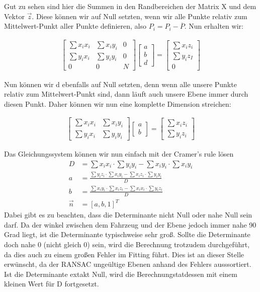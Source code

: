 \documentclass[11pt,oneside,openright]{mpreport}
\begin{document}
Gut zu sehen sind hier die Summen in den Randbereichen der Matrix X und dem Vektor $\vec{z}$. Diese können wir auf Null setzten, wenn wir alle Punkte relativ zum Mittelwert-Punkt
aller Punkte definieren, also $P_i = P_i - \overline{P}$. Nun erhalten wir:

\begin{align*}
\begin{bmatrix}
\sum x_i x_i & \sum x_i y_i & 0 \\
\sum y_i x_i & \sum y_i y_i & 0 \\
0 & 0 & N
\end{bmatrix} 
\begin{bmatrix}
a \\
b \\
d 
\end{bmatrix} 
 = 
\begin{bmatrix}
\sum x_i z_i \\
\sum y_i z_I \\
0 
\end{bmatrix} 
\end{align*}

Nun können wir d ebenfalls auf Null setzten, denn wenn alle unsere Punkte relativ zum Mittelwert-Punkt sind, dann läuft auch unsere Ebene immer durch diesen Punkt. Daher können wir 
nun eine komplette Dimension streichen:

\begin{align*}
\begin{bmatrix}
\sum x_i x_i & \sum x_i y_i \\
\sum y_i x_i & \sum y_i y_i
\end{bmatrix} 
\begin{bmatrix}
a \\
b 
\end{bmatrix} 
 = 
\begin{bmatrix}
\sum x_i z_i \\
\sum y_i z_i
\end{bmatrix} 
\end{align*}

Das Gleichungssystem können wir nun einfach mit der Cramer's rule lösen
\begin{align*}
D &= \sum x_i x_i \cdot \sum y_i y_i - \sum x_i y_i \cdot \sum x_i y_i \\
a &= \frac{\sum y_i z_i \cdot \sum x_i y_i - \sum x_i z_i \cdot \sum y_i y_i }{D}\\
b &= \frac{\sum x_i y_i \cdot \sum x_i z_i - \sum x_i x_i \cdot \sum y_i z_i }{D}\\
\vec{n} &= [a, b, 1]^T
\end{align*}
Dabei gibt es zu beachten, dass die Determinante nicht Null oder nahe Null sein darf.
Da der winkel zwischen dem Fahrzeug und der Ebene jedoch immer nahe 90 Grad liegt, ist die Determinante typischweise sehr groß. 
Sollte die Determinante doch nahe 0 (nicht gleich 0) sein, wird die Berechnung trotzudem durchgeführt, da dies auch zu einem 
großen Fehler im Fitting führt. Dies ist an dieser Stelle erwünscht, da der \ac{RANSAC} ungeültige Ebenen anhand des Fehlers ausssortiert.
Ist die Determinante extakt Null, wird die Berechnungstatdessen mit einem kleinen Wert für D fortgesetzt.
\end{document}

